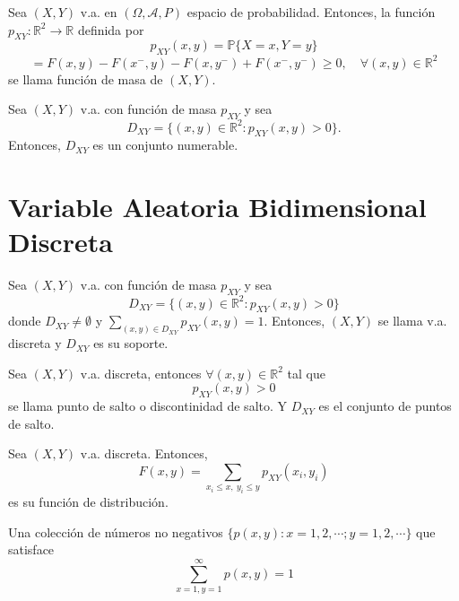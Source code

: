 \begin{defn}
  Sea $(X,Y)$ v.a. en $(\Omega, \mathcal{A}, P )$ espacio de probabilidad. Entonces, la función $p_{XY} : \mathbb{R}^{2} \to \mathbb{R}$ definida por
  \[ 
    p_{XY}(x,y) = \mathbb{P} \{ X = x, Y = y \}
  \] 
  \[ 
    = F(x,y) - F(x^{-}, y) - F(x, y^{-}) + F(x^{-}, y^{-}) \geq 0, \quad \forall (x,y) \in \mathbb{R}^{2}
  \] 
  se llama función de masa de $(X,Y)$.
\end{defn}

\begin{theo}
  Sea $(X,Y)$ v.a. con función de masa $p_{XY}$ y sea
  \[ 
    D_{XY} = \{ (x, y) \in \mathbb{R}^{2} : p_{XY}(x,y) > 0 \}.
  \] 
  Entonces, $D_{XY}$ es un conjunto numerable.
\end{theo}

\section{Variable Aleatoria Bidimensional Discreta}

\begin{defn}
  Sea $(X,Y)$ v.a. con función de masa $p_{XY}$ y sea 
  \[ 
    D_{XY} = \{ (x,y) \in \mathbb{R}^{2} : p_{XY}(x,y) > 0 \}
  \] 
  donde $D_{XY} \neq \emptyset$ y $\sum_{(x,y) \in D_{XY}} p_{XY}(x,y) = 1$. Entonces, $(X, Y)$ se llama v.a. discreta y $D_{XY}$ es su soporte.
\end{defn}

\begin{defn}
  Sea $(X, Y)$ v.a. discreta, entonces $\forall (x,y) \in \mathbb{R}^{2}$ tal que
  \[
    p_{XY}(x,y) > 0
  \]
  se llama punto de salto o discontinidad de salto. Y $D_{XY}$ es el conjunto de puntos de salto.
\end{defn}

\begin{defn}
  Sea $(X, Y)$ v.a. discreta. Entonces,
  \[ 
    F(x,y) = \sum_{x_{i} \leq x, \ y_{i} \leq y} p_{XY}(x_{i}, y_{i})
  \]
  es su función de distribución.
\end{defn}

\begin{theo}
  Una colección de números no negativos $\{ p(x,y): x = 1, 2,\cdots ; y = 1, 2, \cdots \}$ que satisface
  \[ 
    \sum_{x = 1, y = 1}^{\infty} p(x, y) = 1
  \] 
\end{theo}

